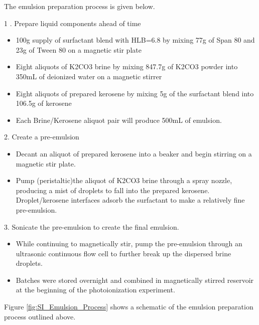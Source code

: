 The emulsion preparation process is given below. 

1 . Prepare liquid components ahead of time 
  \begin{itemize}
  \item 100g supply of surfactant blend with HLB=6.8 by mixing 77g of Span 80 and 23g of Tween 80 on a magnetic stir plate 

  \item Eight aliquots of K2CO3 brine by mixing 847.7g of K2CO3 powder into 350mL of deionized water on a magnetic stirrer 

  \item Eight aliquots of prepared kerosene by mixing 5g of the surfactant blend into 106.5g of kerosene  

  \item Each Brine/Kerosene aliquot pair will produce 500mL of emulsion. 
  \end{itemize}


2. Create a pre-emulsion 

  \begin{itemize}
    
  \item Decant an aliquot of prepared kerosene into a beaker and begin stirring on a magnetic stir plate. 

  \item Pump (peristaltic)the aliquot of K2CO3 brine through a spray nozzle, producing a mist of droplets to fall into the prepared kerosene. Droplet/kerosene interfaces adsorb the surfactant to make a relatively fine pre-emulsion. 

  \end{itemize}

3. Sonicate the pre-emulsion to create the final emulsion. 

  \begin{itemize}

  \item While continuing to magnetically stir, pump the pre-emulsion through an ultrasonic continuous flow cell to further break up the dispersed brine droplets. 

  \item Batches were stored overnight and combined in magnetically stirred reservoir at the beginning of the photoionization experiment. 
  \end{itemize}

Figure \ref{fig:SI_Emulsion_Process} shows a schematic of the emulsion preparation process outlined above. 



